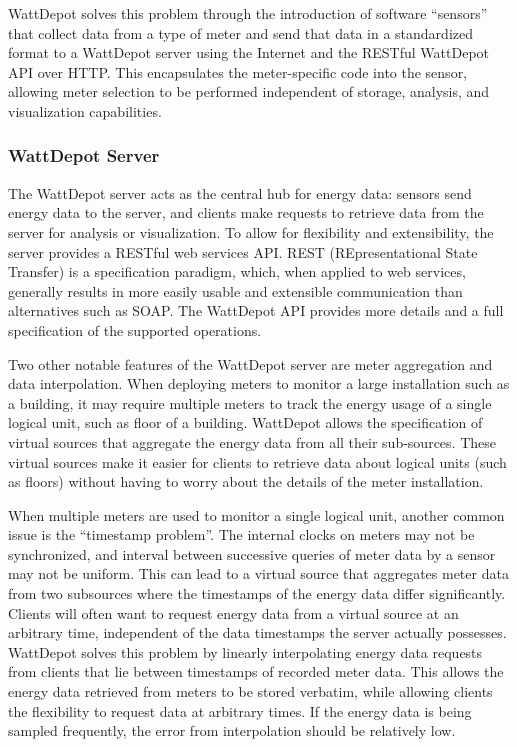 WattDepot solves this problem through the introduction of software ``sensors''
that collect data from a type of meter and send that data in a standardized
format to a WattDepot server using the Internet and the RESTful WattDepot API
over HTTP. This encapsulates the meter-specific code into the sensor, allowing
meter selection to be performed independent of storage, analysis, and
visualization capabilities.

\subsubsection{WattDepot Server}
\label{sec:wattdepot-server}

The WattDepot server acts as the central hub for energy data: sensors send
energy data to the server, and clients make requests to retrieve data from the
server for analysis or visualization. To allow for flexibility and
extensibility, the server provides a RESTful web services API. REST
(REpresentational State Transfer) \cite{REST} is a specification paradigm,
which, when applied to web services, generally results in more easily usable and
extensible communication than alternatives such as SOAP. The WattDepot API
\cite{WattDepotAPI} provides more details and a full specification of the
supported operations.

Two other notable features of the WattDepot server are meter aggregation and
data interpolation. When deploying meters to monitor a large installation such
as a building, it may require multiple meters to track the energy usage of a
single logical unit, such as floor of a building. WattDepot allows the
specification of virtual sources that aggregate the energy data from all their
sub-sources. These virtual sources make it easier for clients to retrieve
data about logical units (such as floors) without having to worry about the
details of the meter installation.

When multiple meters are used to monitor a single logical unit, another common
issue is the ``timestamp problem''. The internal clocks on meters may not be
synchronized, and interval between successive queries of meter data by a sensor
may not be uniform. This can lead to a virtual source that aggregates meter data
from two subsources where the timestamps of the energy data differ
significantly. Clients will often want to request energy data from a virtual
source at an arbitrary time, independent of the data timestamps the server
actually possesses. WattDepot solves this problem by linearly interpolating
energy data requests from clients that lie between timestamps of recorded meter
data. This allows the energy data retrieved from meters to be stored verbatim,
while allowing clients the flexibility to request data at arbitrary times.
If the energy data is being sampled frequently, the error from interpolation
should be relatively low.

